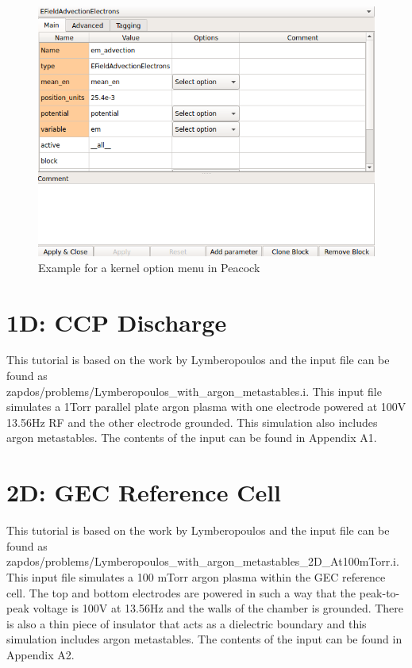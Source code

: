 \documentclass[final]{report}
\begin{document}
\begin{figure}[!h]
  \centering
  \includegraphics[scale=0.5]{zapdos_content/media/em_advection_peacock.png}
  \caption{Example for a kernel option menu in Peacock}
\end{figure}

  \section{1D: CCP Discharge}
  This tutorial is based on the work by Lymberopoulos \cite{1D_GEC} and the input file can be found as \\
  zapdos/problems/Lymberopoulos\_with\_argon\_metastables.i. This input file simulates a 1Torr parallel plate argon plasma with one electrode powered at 100V 13.56Hz RF and the other electrode grounded. This simulation also includes argon metastables. The contents of the input can be found in Appendix A1.

 \section{2D: GEC Reference Cell}
 This tutorial is based on the work by Lymberopoulos \cite{2D_GEC_100mTorr} and the input file can be found as \\
 zapdos/problems/Lymberopoulos\_with\_argon\_metastables\_2D\_At100mTorr.i.  This input file simulates a 100 mTorr argon plasma within the GEC reference cell. The top and bottom electrodes are powered in such a way that the peak-to-peak voltage is 100V at 13.56Hz and the walls of the chamber is grounded. There is also a thin piece of insulator that acts as a dielectric boundary and this simulation includes argon metastables. The contents of the input can be found in Appendix A2.
\end{document}
